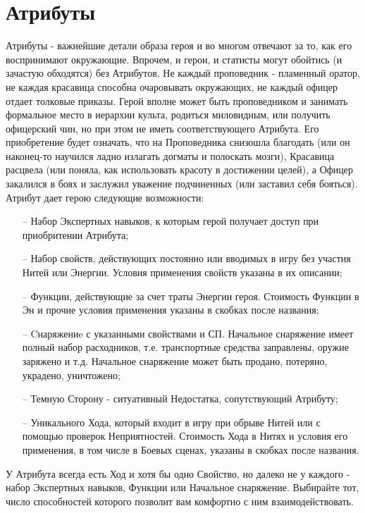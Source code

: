 \section{Атрибуты}
Атрибуты - важнейшие детали образа героя и во многом отвечают за то, как его воспринимают окружающие. 
\newline Впрочем, и герои, и статисты могут обойтись (и зачастую обходятся) без Атрибутов. Не каждый проповедник - пламенный оратор, не каждая красавица способна очаровывать окружающих, не каждый офицер отдает толковые приказы. Герой вполне может быть проповедником и занимать формальное место в иерархии культа, родиться миловидным, или получить офицерский чин, но при этом не иметь соответствующего Атрибута. Его приобретение будет означать, что на Проповедника снизошла благодать (или он наконец-то научился ладно излагать догматы и полоскать мозги), Красавица расцвела (или поняла, как использовать красоту в достижении целей), а Офицер закалился в боях и заслужил уважение подчиненных (или заставил себя бояться).
Атрибут дает герою следующие возможности:
\begin{itemize}
    \item[--] Набор Экспертных навыков, к которым герой получает доступ при приобритении Атрибута;
    \item[--] Набор свойств, действующих постоянно или вводимых в игру без участия Нитей или Энергии. Условия применения свойств указаны в их описании;
    \item[--] Функции, действующие за счет траты Энергии героя. Стоимость Функции в Эн и прочие условия применения указаны в скобках после названия;
    \item[--] Cнаряжениe с указанными свойствами и СП. Начальное снаряжение имеет полный набор расходников, т.е. транспортные средства заправлены, оружие заряжено и т.д. Начальное снаряжение может быть продано, потеряно, украдено, уничтожено;
    \item[--] Темную Сторону - ситуативный Недостатка, сопутствующий Атрибуту;
    \item[--] Уникального Хода, который входит в игру при обрыве Нитей или с помощью проверок Неприятностей. Стоимость Хода в Нитях и условия его применения, в том числе в Боевых сценах, указаны в скобках после названия.
\end{itemize}

\begin{tcolorbox}
    У Атрибута всегда есть Ход и хотя бы одно Свойство, но далеко не у каждого - набор Экспертных навыков, Функции или Начальное снаряжение. Выбирайте тот, число способностей которого позволит вам комфортно с ним взаимодействовать.
\end{tcolorbox}


